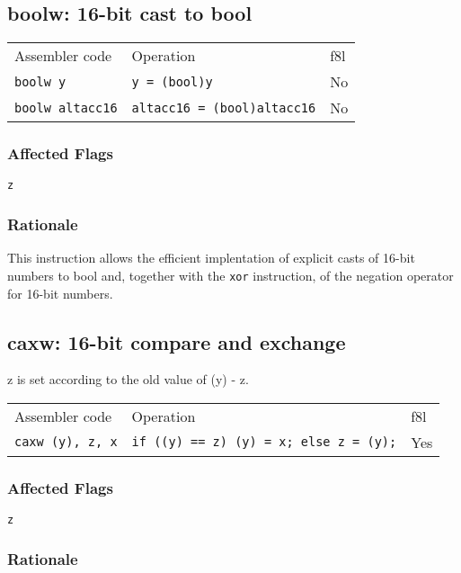 \documentclass{book}
\begin{document}
\subsection{boolw: 16-bit cast to bool}

\begin{tabular}{l l l}
Assembler code          & Operation                          & f8l \\
\texttt{boolw y}        & \texttt{y = (bool)y}               & No \\
\texttt{boolw altacc16} & \texttt{altacc16 = (bool)altacc16} & No \\
\end{tabular}

\subsubsection*{Affected Flags}

\texttt{z}

\subsubsection*{Rationale}

This instruction allows the efficient implentation of explicit casts of 16-bit numbers to bool and, together with the \texttt{xor} instruction, of the negation operator for 16-bit numbers.


\subsection{caxw: 16-bit compare and exchange}

z is set according to the old value of (y) - z.

\begin{tabular}{l l l}
Assembler code           & Operation                                     & f8l \\
\texttt{caxw (y), z, x}  & \texttt{if ((y) == z) (y) = x; else z = (y);} & Yes \\

\end{tabular}

\subsubsection*{Affected Flags}

\texttt{z}

\subsubsection*{Rationale}
\end{document}

